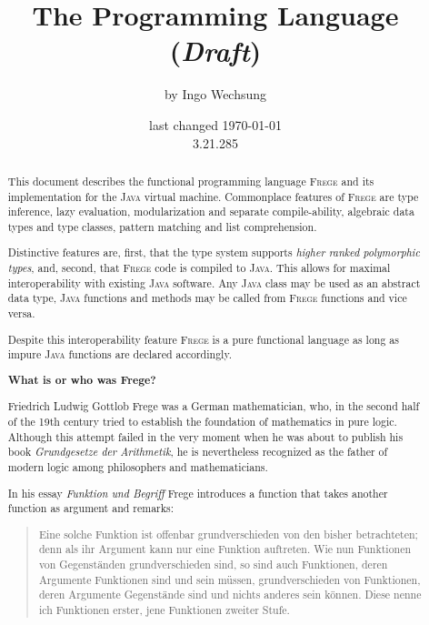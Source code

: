 \documentclass[letterpaper,12pt]{report}
\date{last changed \today{} \\ 3.21.285}
\author{\small{by Ingo Wechsung}}
\title{The \frege{} Programming Language (\emph{Draft})}
\newcommand{\inmargin}[1]{\marginpar{\scriptsize\raggedright #1}}
\newcommand{\frege}[0]{\textsc{Frege}}
\newcommand{\java}[0]{\textsc{Java}}
\begin{document}
\maketitle



\begin{abstract}

This document describes the functional programming language \frege{}
and its implementation
for the \java{} virtual machine. Commonplace features of \frege{} are
type inference,
lazy evaluation,
modularization and separate compile-ability,
algebraic data types and type classes,
pattern matching and list comprehension.

Distinctive features are, first, that the type system supports
\emph{higher ranked polymorphic types},
and, second,
that \frege{} code is compiled to \java{}.
This allows for maximal interoperability with existing
\java{} software.
Any \java{} class may be used as an abstract data type, \java{}
functions and methods may be called from \frege{} functions and vice
versa.

Despite this interoperability feature  \frege{} is a pure functional language as long as impure \java{} functions are declared accordingly.

\begin{center}\textbf{What is or who was Frege?}\end{center}

Friedrich Ludwig Gottlob Frege
was a
German mathematician, who, in the second half of the 19th
century tried to establish the foundation of mathematics in pure
logic. Although this attempt failed in the very moment when he
was about to publish his book \emph{Grundgesetze der Arithmetik},
he is nevertheless recognized as the father of modern logic among
philosophers and mathematicians.

In his essay \emph{Funktion und Begriff} \cite{f1891} Frege introduces a function that takes another function as argument and remarks:

\begin{quote}
\small{
Eine solche Funktion ist offenbar grundverschieden von den bisher betrachteten; denn als ihr Argument kann nur eine Funktion auftreten. Wie nun Funktionen von Gegenständen grundverschieden sind, so sind auch Funktionen, deren Argumente Funktionen sind und sein müssen, grundverschieden von Funktionen, deren Argumente Gegenstände sind und nichts anderes sein können. Diese nenne ich Funktionen erster, jene Funktionen zweiter Stufe.
}
\end{quote}


\end{abstract}
\end{document}
